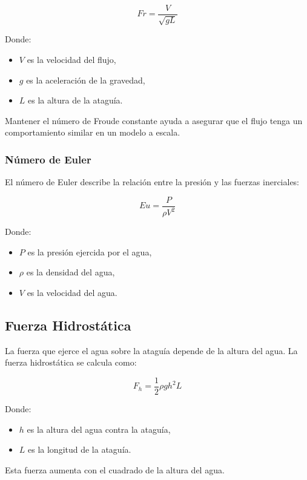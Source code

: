 \begin{equation}
Fr = \frac{V}{\sqrt{g L}}
\end{equation}

Donde:
\begin{itemize}
    \item $V$ es la velocidad del flujo,
    \item $g$ es la aceleración de la gravedad,
    \item $L$ es la altura de la ataguía.
\end{itemize}

Mantener el número de Froude constante ayuda a asegurar que el flujo tenga un comportamiento similar en un modelo a escala.

\subsubsection{Número de Euler}
El número de Euler describe la relación entre la presión y las fuerzas inerciales:

\begin{equation}
Eu = \frac{P}{\rho V^2}
\end{equation}

Donde:
\begin{itemize}
    \item $P$ es la presión ejercida por el agua,
    \item $\rho$ es la densidad del agua,
    \item $V$ es la velocidad del agua.
\end{itemize}

\subsection{Fuerza Hidrostática}
La fuerza que ejerce el agua sobre la ataguía depende de la altura del agua. La fuerza hidrostática se calcula como:

\begin{equation}
F_h = \frac{1}{2} \rho g h^2 L
\end{equation}

Donde:
\begin{itemize}
    \item $h$ es la altura del agua contra la ataguía,
    \item $L$ es la longitud de la ataguía.
\end{itemize}

Esta fuerza aumenta con el cuadrado de la altura del agua.

